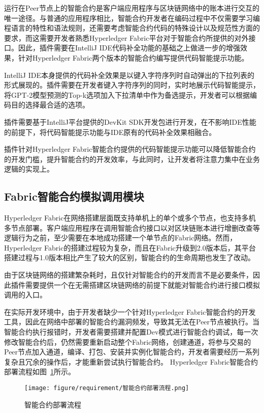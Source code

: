 运行在Peer节点上的智能合约是客户端应用程序与区块链网络中的账本进行交互的唯一途径。与普通的应用程序相比，智能合约开发者在编码过程中不仅需要学习编程语言的特性和语法规则，还需要考虑智能合约代码的特殊设计以及规范性方面的要求，而这需要开发者熟悉Hyperledger Fabric平台对于智能合约所提供的对外接口。因此，插件需要在IntelliJ IDE代码补全功能的基础之上做进一步的增强效果，针对Hyperledger Fabric两个版本的智能合约编写提供代码智能提示功能。

IntelliJ IDE本身提供的代码补全效果是以键入字符序列时自动弹出的下拉列表的形式展现的。插件需要在开发者键入字符序列的同时，实时地展示代码智能提示，将GPT-2模型预测的Top-k选项加入下拉清单中作为备选提示，开发者可以根据编码目的选择最合适的选项。

插件需要基于IntelliJ平台提供的DevKit SDK开发包进行开发，在不影响IDE性能的前提下，将代码智能提示功能与IDE原有的代码补全效果相融合。

插件针对Hyperledger Fabric智能合约提供的代码智能提示功能可以降低智能合约的开发门槛，提升智能合约的开发效率，与此同时，让开发者将注意力集中在业务逻辑的实现上。

\subsection{Fabric智能合约模拟调用模块}

Hyperledger Fabric在网络搭建层面既支持单机上的单个或多个节点，也支持多机多节点部署。客户端应用程序在调用智能合约接口以对区块链账本进行增删改查等逻辑行为之前，至少需要在本地成功搭建一个单节点的Fabric网络。然而，Hyperledger Fabric的搭建过程较为复杂，而且在Fabric升级到2.0版本后，其平台搭建过程与1.0版本相比产生了较大的区别，智能合约的生命周期也发生了改动。

由于区块链网络的搭建繁杂耗时，且仅针对智能合约的开发而言不是必要条件，因此插件需要提供一个在无需搭建区块链网络的前提下就能对智能合约进行接口模拟调用的入口。

在实际开发环境中，由于开发者缺少一个针对Hyperledger Fabric智能合约的开发工具，因此在网络中部署的智能合约漏洞频发，导致其无法在Peer节点被执行。当智能合约执行报错时，开发者需要搭建并配置Dev模式进行智能合约调试，每一次修改智能合约后，仍然需要重新启动整个Fabric网络，创建通道，将参与交易的Peer节点加入通道，编译、打包、安装并实例化智能合约，开发者需要经历一系列复杂且冗余的操作后，才能重新尝试执行智能合约。
Hyperledger Fabric智能合约部署流程如图~\ref{fig:3.2}所示。

\begin{figure}[htb]
  \centering
  \texttt{[image: figure/requirement/智能合约部署流程.png]}
  \caption{智能合约部署流程}\label{fig:3.2}
\end{figure}

